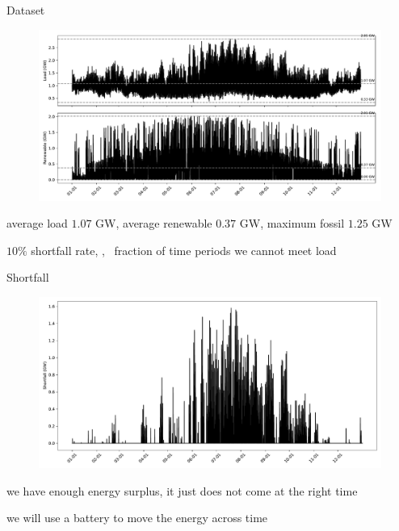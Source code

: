 \documentclass[aspectratio=169,11pt]{beamer}
\begin{document}
\begin{frame}{Dataset}
	
\begin{figure}
\centering
\includegraphics[width=0.8\columnwidth]{./figures/load_renewable.pdf}
\end{figure}

\BIT
\item average load $1.07$ GW, average renewable $0.37$ GW, maximum fossil $1.25$ GW
\item $10\%$ shortfall rate, \ie, \ fraction of time periods we cannot meet load
\EIT
	
\end{frame}

\begin{frame}{Shortfall}
	
\begin{figure}
\centering
\includegraphics[width=0.8\columnwidth]{./figures/shortfall.pdf}
\end{figure}

\BIT
\item we have enough energy surplus, it just does not come at the right time
\item we will use a battery to move the energy across time
\EIT
\end{frame}
\end{document}
